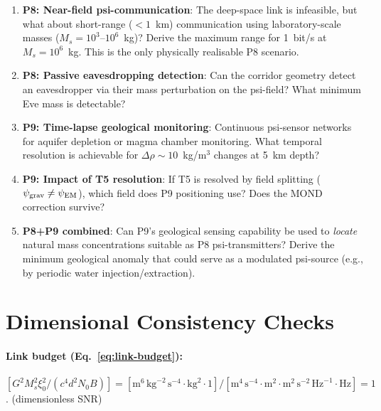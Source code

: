 \documentclass[aps,prd,twocolumn,superscriptaddress,nofootinbib]{revtex4-2}
\begin{document}
\begin{enumerate}
\item \textbf{P8: Near-field psi-communication}: The deep-space link
  is infeasible, but what about short-range ($< 1$~km) communication
  using laboratory-scale masses ($M_s = 10^3$--$10^6$~kg)? Derive the
  maximum range for 1~bit/s at $M_s = 10^6$~kg. This is the only
  physically realisable P8 scenario.

\item \textbf{P8: Passive eavesdropping detection}: Can the corridor
  geometry detect an eavesdropper via their mass perturbation on the
  psi-field? What minimum Eve mass is detectable?

\item \textbf{P9: Time-lapse geological monitoring}: Continuous
  psi-sensor networks for aquifer depletion or magma chamber monitoring.
  What temporal resolution is achievable for $\Delta\rho \sim 10$~kg/m$^3$
  changes at 5~km depth?

\item \textbf{P9: Impact of T5 resolution}: If T5 is resolved by
  field splitting ($\psi_{\rm grav} \neq \psi_{\rm EM}$), which field
  does P9 positioning use? Does the MOND correction survive?

\item \textbf{P8+P9 combined}: Can P9's geological sensing capability
  be used to \emph{locate} natural mass concentrations suitable as
  P8 psi-transmitters? Derive the minimum geological anomaly that
  could serve as a modulated psi-source (e.g., by periodic water
  injection/extraction).
\end{enumerate}

\section{Dimensional Consistency Checks}
\label{sec:dimensions}

\paragraph{Link budget (Eq.~\ref{eq:link-budget}):}
$[G^2 M_s^2 \xi_0^2/(c^4 d^2 N_0 B)]
= [\mathrm{m}^6\,\mathrm{kg}^{-2}\,\mathrm{s}^{-4}
\cdot \mathrm{kg}^2 \cdot 1]/[\mathrm{m}^4\,\mathrm{s}^{-4}
\cdot \mathrm{m}^2 \cdot \mathrm{m}^2\,\mathrm{s}^{-2}\,\mathrm{Hz}^{-1}
\cdot \mathrm{Hz}] = 1$. \checkmark (dimensionless SNR)
\end{document}
